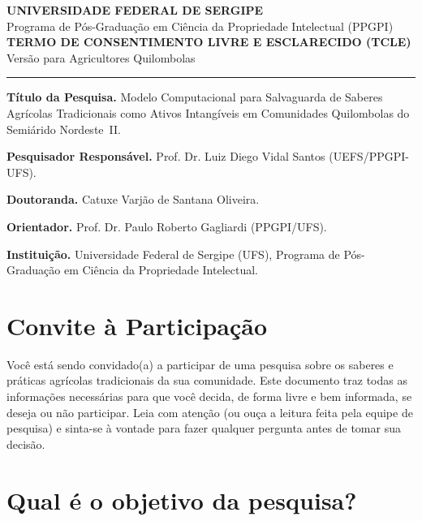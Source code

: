 \documentclass[12pt,a4paper,brazil]{article}
\begin{document}
\begin{center}
{\large\bfseries UNIVERSIDADE FEDERAL DE SERGIPE}\\[0.3cm]
{\normalsize Programa de Pós-Graduação em Ciência da Propriedade Intelectual (PPGPI)}\\[1cm]
{\Large\bfseries TERMO DE CONSENTIMENTO LIVRE E ESCLARECIDO (TCLE)}\\[0.3cm]
{\normalsize Versão para Agricultores Quilombolas}\\[0.5cm]
\noindent\rule{\textwidth}{0.4pt}
\end{center}

\vspace{0.5cm}

\noindent\textbf{Título da Pesquisa.} Modelo Computacional para Salvaguarda de Saberes Agrícolas Tradicionais como Ativos Intangíveis em Comunidades Quilombolas do Semiárido Nordeste~II.

\noindent\textbf{Pesquisador Responsável.} Prof. Dr. Luiz Diego Vidal Santos (UEFS/PPGPI-UFS).

\noindent\textbf{Doutoranda.} Catuxe Varjão de Santana Oliveira.

\noindent\textbf{Orientador.} Prof. Dr. Paulo Roberto Gagliardi (PPGPI/UFS).

\noindent\textbf{Instituição.} Universidade Federal de Sergipe (UFS), Programa de Pós-Graduação em Ciência da Propriedade Intelectual.

\vspace{0.5cm}

\section*{Convite à Participação}

Você está sendo convidado(a) a participar de uma pesquisa sobre os saberes e práticas agrícolas tradicionais da sua comunidade. Este documento traz todas as informações necessárias para que você decida, de forma livre e bem informada, se deseja ou não participar. Leia com atenção (ou ouça a leitura feita pela equipe de pesquisa) e sinta-se à vontade para fazer qualquer pergunta antes de tomar sua decisão.

\section*{Qual é o objetivo da pesquisa?}
\end{document}
